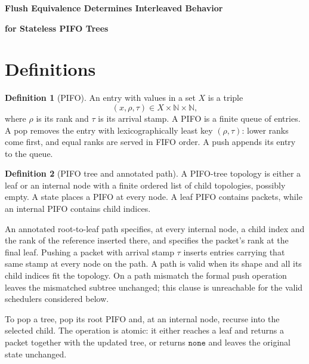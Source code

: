\documentclass[11pt]{article}
\theoremstyle{definition}
\newtheorem{definition}{Definition}
\newcommand{\None}{\texttt{none}}
\begin{document}
\begin{center}
  {\LARGE\bfseries Flush Equivalence Determines Interleaved Behavior\par}
  \vspace{0.35em}
  {\LARGE\bfseries for Stateless PIFO Trees\par}
\end{center}
\vspace{1.2em}

\section*{Definitions}

\begin{definition}[PIFO]
An entry with values in a set \(X\) is a triple
\[
  (x,\rho,\tau)\in X\times\mathbb N\times\mathbb N,
\]
where \(\rho\) is its rank and \(\tau\) is its arrival stamp.  A PIFO is a
finite queue of entries.  A pop removes the entry with lexicographically
least key \((\rho,\tau)\): lower ranks come first, and equal ranks are served
in FIFO order.  A push appends its entry to the queue.
\end{definition}

\begin{definition}[PIFO tree and annotated path]
A PIFO-tree topology is either a leaf or an internal node with a finite
ordered list of child topologies, possibly empty.  A state places a PIFO at
every node.  A leaf PIFO contains packets, while an internal PIFO contains
child indices.

An annotated root-to-leaf path specifies, at every internal node, a child
index and the rank of the reference inserted there, and specifies the
packet's rank at the final leaf.  Pushing a packet with arrival stamp
\(\tau\) inserts entries carrying that same stamp at every node on the path.
A path is valid when its shape and all its child indices fit the topology.
On a path mismatch the formal push operation leaves the mismatched subtree
unchanged; this clause is unreachable for the valid schedulers considered
below.

To pop a tree, pop its root PIFO and, at an internal node, recurse into the
selected child.  The operation is atomic: it either reaches a leaf and
returns a packet together with the updated tree, or returns \(\None\) and
leaves the original state unchanged.
\end{definition}
\end{document}
